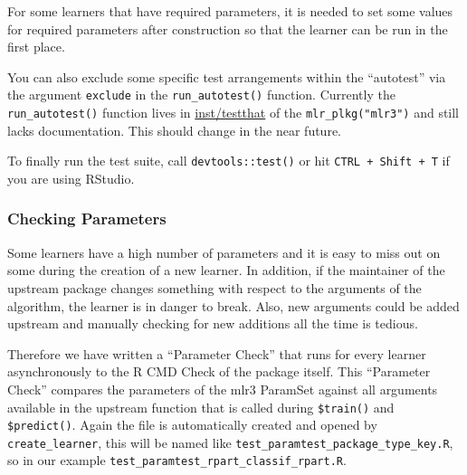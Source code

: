\documentclass[
]{scrbook}
\newenvironment{Shaded}{\begin{snugshade}}{\end{snugshade}}
\newcommand{\AttributeTok}[1]{\textcolor[rgb]{0.77,0.63,0.00}{#1}}
\newcommand{\FunctionTok}[1]{\textcolor[rgb]{0.00,0.00,0.00}{#1}}
\newcommand{\NormalTok}[1]{#1}
\newcommand{\OtherTok}[1]{\textcolor[rgb]{0.56,0.35,0.01}{#1}}
\newcommand{\SpecialCharTok}[1]{\textcolor[rgb]{0.00,0.00,0.00}{#1}}
\newcommand{\StringTok}[1]{\textcolor[rgb]{0.31,0.60,0.02}{#1}}
\renewenvironment{Shaded} {\begin{snugshade}\small} {\end{snugshade}}
\begin{document}
\begin{Shaded}
\end{Shaded}

For some learners that have required parameters, it is needed to set some values for required parameters after construction so that the learner can be run in the first place.

You can also exclude some specific test arrangements within the ``autotest'' via the argument \texttt{exclude} in the \texttt{run\_autotest()} function.
Currently the \texttt{run\_autotest()} function lives in \href{https://github.com/mlr-org/mlr3/blob/f16326bf34bcac59c3b0a2fdbcf90dbebb3b4bbc/inst/testthat/helper_autotest.R}{inst/testthat} of the \texttt{mlr\_plkg("mlr3")} and still lacks documentation.
This should change in the near future.

To finally run the test suite, call \texttt{devtools::test()} or hit \texttt{CTRL\ +\ Shift\ +\ T} if you are using RStudio.

\hypertarget{learner-test-parameter}{%
\subsubsection{Checking Parameters}\label{learner-test-parameter}}

Some learners have a high number of parameters and it is easy to miss out on some during the creation of a new learner.
In addition, if the maintainer of the upstream package changes something with respect to the arguments of the algorithm, the learner is in danger to break.
Also, new arguments could be added upstream and manually checking for new additions all the time is tedious.

Therefore we have written a ``Parameter Check'' that runs for every learner asynchronously to the R CMD Check of the package itself. This ``Parameter Check'' compares the parameters of the mlr3 ParamSet against all arguments available in the upstream function that is called during \texttt{\$train()} and \texttt{\$predict()}. Again the file is automatically created and opened by \texttt{create\_learner}, this will be named like \texttt{test\_paramtest\_package\_type\_key.R}, so in our example \texttt{test\_paramtest\_rpart\_classif\_rpart.R}.
\end{document}
